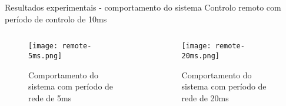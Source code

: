 \begin{frame}{Resultados experimentais - comportamento do sistema}
	\centering
	Controlo remoto com per\'{i}odo de controlo de 10ms
	\begin{columns}
		\begin{column}{0.5\linewidth}
			\begin{figure}
				\centering
				\texttt{[image: remote-5ms.png]}
				\caption{Comportamento do sistema com per\'{i}odo de rede de 5ms}
			\end{figure}
		\end{column}
		\begin{column}{0.5\linewidth}
			\begin{figure}
				\centering
				\texttt{[image: remote-20ms.png]}
				\caption{Comportamento do sistema com per\'{i}odo de rede de 20ms}
			\end{figure}
		\end{column}
	\end{columns}
\end{frame}